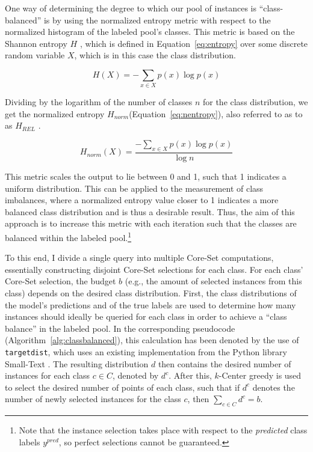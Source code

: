 \documentclass[english,bachelor,ul]{webisthesis} %
\begin{document}
One way of determining the degree to which our pool of instances is ``class-balanced'' is by using the normalized entropy metric with respect to the normalized histogram of the labeled pool's classes. This metric is based on the Shannon entropy $ H $ \citep{DBLP:journals/bstj/Shannon48}, which is defined in Equation~\ref{eq:entropy} over some discrete random variable $ X $, which is in this case the class distribution.

\begin{equation}\label{eq:entropy}
    H(X) = -\sum_{x \in X} p(x) \log p(x)
\end{equation}

\noindent Dividing by the logarithm of the number of classes $n$ for the class distribution, we get the normalized entropy $ H_{norm} $(Equation~\ref{eq:nentropy}), also referred to as to as $ H_{REL} $ \citep{wilcox1967indices}.

\begin{equation}\label{eq:nentropy}
    H_{norm}(X) = \frac{-\sum_{x \in X} p(x) \log p(x)}{\log n}
\end{equation}

\noindent This metric scales the output to lie between 0 and 1, such that 1 indicates a uniform distribution. This can be applied to the measurement of class imbalances, where a normalized entropy value closer to 1 indicates a more balanced class distribution and is thus a desirable result. Thus, the aim of this approach is to increase this metric with each iteration such that the classes are balanced within the labeled pool.\footnote{Note that the instance selection takes place with respect to the \textit{predicted} class labels $ y^{pred} $, so perfect selections cannot be guaranteed.}

To this end, I divide a single query into multiple Core-Set computations, essentially constructing disjoint Core-Set selections for each class. For each class' Core-Set selection, the budget $ b $ (e.g., the amount of selected instances from this class) depends on the desired class distribution. First, the class distributions of the model's predictions and of the true labels are used to determine how many instances should ideally be queried for each class in order to achieve a ``class balance'' in the labeled pool. In the corresponding pseudocode (Algorithm~\ref{alg:classbalanced}), this calculation has been denoted by the use of \texttt{target\textunderscore dist}, which uses an existing implementation from the Python library Small-Text \citep{schroeder2023small-text}. The resulting distribution $ d $ then contains the desired number of instances for each class $ c \in C $, denoted by $ d^c $. After this, $k$-Center greedy is used to select the desired number of points of each class, such that if $ d^c $ denotes the number of newly selected instances for the class $ c $, then $ \sum_{c \in C} d^c = b $. 
\end{document}
